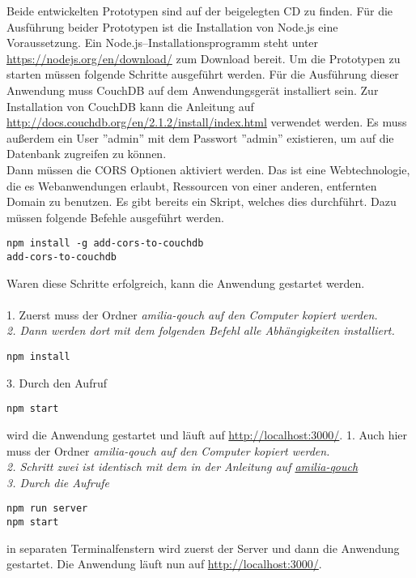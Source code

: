 Beide entwickelten Prototypen sind auf der beigelegten CD zu finden.
Für die Ausführung beider Prototypen ist die Installation von Node.js eine Voraussetzung.
Ein Node.js--Installationsprogramm steht unter \url{https://nodejs.org/en/download/} zum Download bereit.
Um die Prototypen zu starten müssen folgende Schritte ausgeführt werden.
%
%
Für die Ausführung dieser Anwendung muss CouchDB auf dem Anwendungsgerät installiert sein.
Zur Installation von CouchDB kann die Anleitung auf \url{http://docs.couchdb.org/en/2.1.2/install/index.html} verwendet werden.
Es muss außerdem ein User ''admin'' mit dem Passwort ''admin'' existieren, um auf die Datenbank zugreifen zu können.\\
Dann müssen die \gls{CORS} Optionen aktiviert werden.
Das ist eine Webtechnologie, die es Webanwendungen erlaubt, Ressourcen von einer anderen, entfernten Domain zu benutzen.
Es gibt bereits ein Skript, welches dies durchführt. Dazu müssen folgende Befehle ausgeführt werden.
%
\begin{lstlisting}
npm install -g add-cors-to-couchdb
add-cors-to-couchdb
\end{lstlisting}
%
Waren diese Schritte erfolgreich, kann die Anwendung gestartet werden.\\\\
1. Zuerst muss der Ordner \it{amilia-qouch} auf den Computer kopiert werden.\vspace{0.3cm}\\
2. Dann werden dort mit dem folgenden Befehl alle Abhängigkeiten installiert.
\begin{lstlisting}
npm install
\end{lstlisting}\vspace{0.3cm}
%
3. Durch den Aufruf
\begin{lstlisting}
npm start
\end{lstlisting}
wird die Anwendung gestartet und läuft auf \url{http://localhost:3000/}.
%
%
%
1. Auch hier muss der Ordner \it{amilia-qouch} auf den Computer kopiert werden.\vspace{0.3cm}\\
2. Schritt zwei ist identisch mit dem in der Anleitung auf \hyperref[chap:install:qouch]{\it{amilia-qouch}}\vspace{0.3cm}\\
3. Durch die Aufrufe
\begin{lstlisting}
npm run server
npm start
\end{lstlisting}\vspace{0.3cm}
in separaten Terminalfenstern wird zuerst der Server und dann die Anwendung gestartet.
Die Anwendung läuft nun auf \url{http://localhost:3000/}.